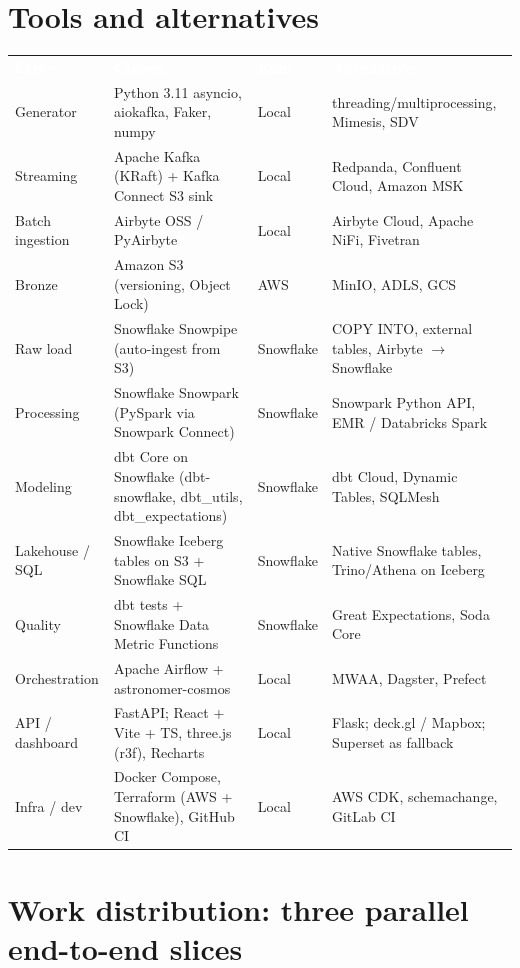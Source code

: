 \documentclass[10pt,a4paper]{article}
\newcommand{\thead}[1]{\textcolor{white}{\bfseries #1}}
\begin{document}
\section{Tools and alternatives}

{\scriptsize
{}
\begin{tabularx}{\linewidth}{@{}>{\raggedright\arraybackslash}p{2.4cm}>{\raggedright\arraybackslash}p{6.4cm}>{\raggedright\arraybackslash}p{1.6cm}Y@{}}
\thead{Layer} & \thead{Chosen} & \thead{Runs} & \thead{Alternatives} \\
Generator & Python 3.11 asyncio, aiokafka, Faker, numpy & Local & threading/multiprocessing, Mimesis, SDV \\
Streaming & Apache Kafka (KRaft) + Kafka Connect S3 sink & Local & Redpanda, Confluent Cloud, Amazon MSK \\
Batch ingestion & Airbyte OSS / PyAirbyte & Local & Airbyte Cloud, Apache NiFi, Fivetran \\
Bronze & Amazon S3 (versioning, Object Lock) & AWS & MinIO, ADLS, GCS \\
Raw load & Snowflake Snowpipe (auto-ingest from S3) & Snowflake & COPY INTO, external tables, Airbyte $\rightarrow$ Snowflake \\
Processing & Snowflake Snowpark (PySpark via Snowpark Connect) & Snowflake & Snowpark Python API, EMR / Databricks Spark \\
Modeling & dbt Core on Snowflake (dbt-snowflake, dbt\_utils, dbt\_expectations) & Snowflake & dbt Cloud, Dynamic Tables, SQLMesh \\
Lakehouse / SQL & Snowflake Iceberg tables on S3 + Snowflake SQL & Snowflake & Native Snowflake tables, Trino/Athena on Iceberg \\
Quality & dbt tests + Snowflake Data Metric Functions & Snowflake & Great Expectations, Soda Core \\
Orchestration & Apache Airflow + astronomer-cosmos & Local & MWAA, Dagster, Prefect \\
API / dashboard & FastAPI; React + Vite + TS, three.js (r3f), Recharts & Local & Flask; deck.gl / Mapbox; Superset as fallback \\
Infra / dev & Docker Compose, Terraform (AWS + Snowflake), GitHub CI & Local & AWS CDK, schemachange, GitLab CI \\
\end{tabularx}}

\section{Work distribution: three parallel end-to-end slices}
\end{document}
